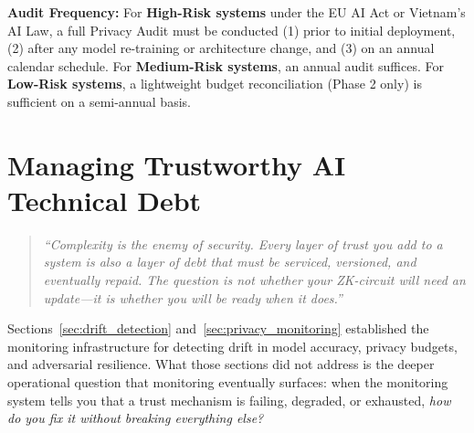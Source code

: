 \begin{svgraybox}
\textbf{Audit Frequency:} For \textbf{High-Risk systems} under the EU AI Act or Vietnam's AI Law, a full Privacy Audit must be conducted (1) prior to initial deployment, (2) after any model re-training or architecture change, and (3) on an annual calendar schedule. For \textbf{Medium-Risk systems}, an annual audit suffices. For \textbf{Low-Risk systems}, a lightweight budget reconciliation (Phase 2 only) is sufficient on a semi-annual basis.
\end{svgraybox}



\section{Managing Trustworthy AI Technical Debt}
\label{sec:trust-tech-debt}

\begin{quote}
\textit{``Complexity is the enemy of security. Every layer of
trust you add to a system is also a layer of debt that must be
serviced, versioned, and eventually repaid. The question is not
whether your ZK-circuit will need an update---it is whether you
will be ready when it does.''}
\end{quote}

Sections~\ref{sec:drift_detection}
and~\ref{sec:privacy_monitoring} established the
monitoring infrastructure for detecting drift in model accuracy,
privacy budgets, and adversarial resilience.
What those sections did not address is the deeper operational
question that monitoring eventually surfaces: when the
monitoring system tells you that a trust mechanism is failing,
degraded, or exhausted, \emph{how do you fix it without breaking
everything else?}

